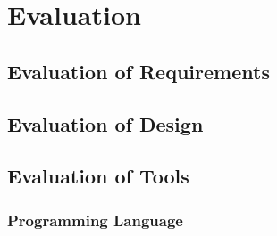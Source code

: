 \chapter{Evaluation}





\section{Evaluation of Requirements}


\section{Evaluation of Design}


\section{Evaluation of Tools}

\subsection{Programming Language}


